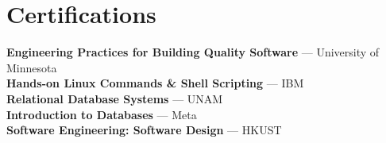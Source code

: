 \section{Certifications}
    \begin{itemize}[leftmargin=0.15in, label={}]
    \small{\item{
        \textbf{Engineering Practices for Building Quality Software}{ — University of Minnesota} \\
        \textbf{Hands-on Linux Commands \& Shell Scripting}{ — IBM } \\
        \textbf{Relational Database Systems}{ — UNAM } \\
        \textbf{Introduction to Databases}{ — Meta } \\
        \textbf{Software Engineering: Software Design}{ — HKUST }
    }}
    \end{itemize}
